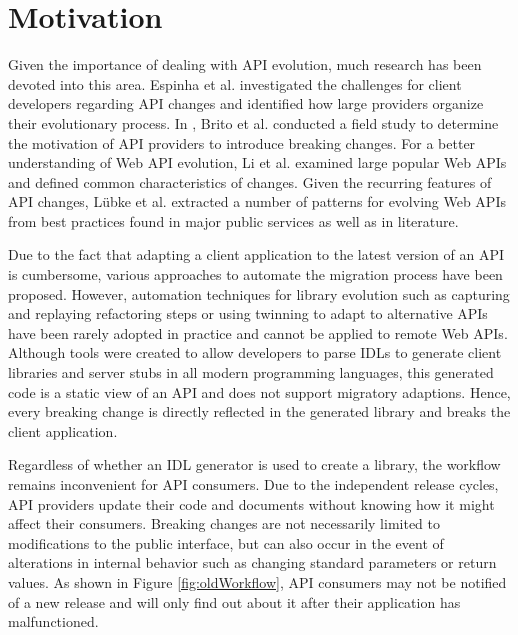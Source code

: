 \section{Motivation}
\label{sec:Motivation}

Given the importance of dealing with API evolution, much research has been devoted into this area. Espinha et al. \cite{espinha_web_2014} investigated the challenges for client developers regarding API changes and identified how large providers organize their evolutionary process. In \cite{brito_you_2020}, Brito et al. conducted a field study to determine the motivation of API providers to introduce breaking changes. For a better understanding of Web API evolution, Li et al. \cite{li_how_2013} examined large popular Web APIs and defined common characteristics of changes. Given the recurring features of API changes, Lübke et al. \cite{lubke_interface_2019} extracted a number of patterns for evolving Web APIs from best practices found in major public services as well as in literature. 

Due to the fact that adapting a client application to the latest version of an API is cumbersome, various approaches to automate the migration process have been proposed. However, automation techniques for library evolution such as capturing and replaying refactoring steps \cite{henkel_catchup!_2005} or using twinning to adapt to alternative APIs \cite{nita_using_2010} have been rarely adopted in practice \cite[p. 300]{li_how_2013} and cannot be applied to remote Web APIs. Although tools were created to allow developers to parse IDLs to generate client libraries and server stubs in all modern programming languages, this generated code is a static view of an API and does not support migratory adaptions. Hence, every breaking change is directly reflected in the generated library and breaks the client application. 

Regardless of whether an IDL generator is used to create a library, the workflow remains inconvenient for API consumers. Due to the independent release cycles, API providers update their code and documents without knowing how it might affect their consumers. Breaking changes are not necessarily limited to modifications to the public interface, but can also occur in the event of alterations in internal behavior such as changing standard parameters or return values. As shown in Figure \ref{fig:oldWorkflow}, API consumers may not be notified of a new release and will only find out about it after their application has malfunctioned. 

